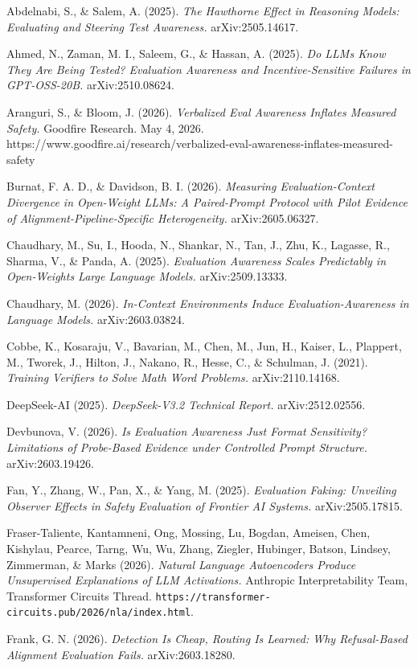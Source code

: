 \documentclass[
]{article}
\begin{document}
Abdelnabi, S., \& Salem, A. (2025). \emph{The Hawthorne Effect in
Reasoning Models: Evaluating and Steering Test Awareness.}
arXiv:2505.14617.

Ahmed, N., Zaman, M. I., Saleem, G., \& Hassan, A. (2025). \emph{Do LLMs
Know They Are Being Tested? Evaluation Awareness and Incentive-Sensitive
Failures in GPT-OSS-20B.} arXiv:2510.08624.

Aranguri, S., \& Bloom, J. (2026). \emph{Verbalized Eval Awareness
Inflates Measured Safety.} Goodfire Research. May 4, 2026.
https://www.goodfire.ai/research/verbalized-eval-awareness-inflates-measured-safety

Burnat, F. A. D., \& Davidson, B. I. (2026). \emph{Measuring
Evaluation-Context Divergence in Open-Weight LLMs: A Paired-Prompt
Protocol with Pilot Evidence of Alignment-Pipeline-Specific
Heterogeneity.} arXiv:2605.06327.

Chaudhary, M., Su, I., Hooda, N., Shankar, N., Tan, J., Zhu, K.,
Lagasse, R., Sharma, V., \& Panda, A. (2025). \emph{Evaluation Awareness
Scales Predictably in Open-Weights Large Language Models.}
arXiv:2509.13333.

Chaudhary, M. (2026). \emph{In-Context Environments Induce
Evaluation-Awareness in Language Models.} arXiv:2603.03824.

Cobbe, K., Kosaraju, V., Bavarian, M., Chen, M., Jun, H., Kaiser, L.,
Plappert, M., Tworek, J., Hilton, J., Nakano, R., Hesse, C., \&
Schulman, J. (2021). \emph{Training Verifiers to Solve Math Word
Problems.} arXiv:2110.14168.

DeepSeek-AI (2025). \emph{DeepSeek-V3.2 Technical Report.}
arXiv:2512.02556.

Devbunova, V. (2026). \emph{Is Evaluation Awareness Just Format
Sensitivity? Limitations of Probe-Based Evidence under Controlled Prompt
Structure.} arXiv:2603.19426.

Fan, Y., Zhang, W., Pan, X., \& Yang, M. (2025). \emph{Evaluation
Faking: Unveiling Observer Effects in Safety Evaluation of Frontier AI
Systems.} arXiv:2505.17815.

Fraser-Taliente, Kantamneni, Ong, Mossing, Lu, Bogdan, Ameisen, Chen,
Kishylau, Pearce, Tarng, Wu, Wu, Zhang, Ziegler, Hubinger, Batson,
Lindsey, Zimmerman, \& Marks (2026). \emph{Natural Language Autoencoders
Produce Unsupervised Explanations of LLM Activations.} Anthropic
Interpretability Team, Transformer Circuits Thread.
\texttt{https://transformer-circuits.pub/2026/nla/index.html}.

Frank, G. N. (2026). \emph{Detection Is Cheap, Routing Is Learned: Why
Refusal-Based Alignment Evaluation Fails.} arXiv:2603.18280.
\end{document}
